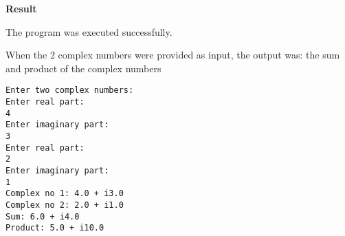 \vspace{0.5cm}
\textbf{Result}
\vspace{0.5cm}

The program was executed successfully. 

When the 2 complex numbers were provided as input, the output was: the sum and product of the complex numbers
\begin{verbatim}
Enter two complex numbers:
Enter real part:
4
Enter imaginary part:
3
Enter real part:
2
Enter imaginary part:
1
Complex no 1: 4.0 + i3.0
Complex no 2: 2.0 + i1.0
Sum: 6.0 + i4.0
Product: 5.0 + i10.0
\end{verbatim}

